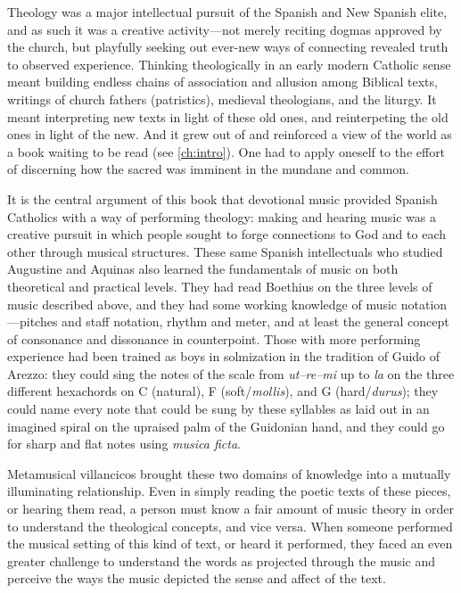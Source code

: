 Theology was a major intellectual pursuit of the Spanish and New Spanish elite,
and as such it was a creative activity---not merely reciting dogmas
approved by the church, but playfully seeking out ever-new ways of connecting
revealed truth to observed experience.
Thinking theologically in an early modern Catholic sense meant building 
endless chains of association and allusion among Biblical texts, writings of
church fathers (patristics), medieval theologians, and the liturgy. 
It meant interpreting new texts in light of these old ones, and reinterpeting
the old ones in light of the new.
And it grew out of and reinforced a view of the world as a book waiting to be
read (see \cref{ch:intro}).
One had to apply oneself to the effort of discerning how the sacred was
imminent in the mundane and common.%
    \Autocite{Chavez:DistortingReality}

It is the central argument of this book that devotional music provided Spanish
Catholics with a way of performing theology: making and hearing music was a
creative pursuit in which people sought to forge connections to God and to each
other through musical structures.
These same Spanish intellectuals who studied Augustine and Aquinas also learned
the fundamentals of music on both theoretical and practical levels.
They had read Boethius on the three levels of music described above, and they
had some working knowledge of music notation---pitches and staff notation,
rhythm and meter, and at least the general concept of consonance and dissonance
in counterpoint.
Those with more performing experience had been trained as boys in solmization in
the tradition of Guido of Arezzo: they could sing the notes of the scale from
\emph{ut--re--mi} up to \emph{la} on the three different hexachords on C
(natural), F (soft/\emph{mollis}), and G (hard/\emph{durus}); they could name
every note that could be sung by these syllables as laid out in an imagined
spiral on the upraised palm of the Guidonian hand, and they could go
 for sharp and flat notes using \emph{musica ficta}.%
    \Autocite{Cohen:NotesMiddleAges}

Metamusical villancicos brought these two domains of knowledge into a mutually
illuminating relationship.
Even in simply reading the poetic texts of these pieces, or hearing them read,
a person must know a fair amount of music theory in order to understand the
theological concepts, and vice versa.
When someone performed the musical setting of this kind of text, or heard it
performed, they faced an even greater challenge to understand the words as
projected through the music and perceive the ways the music depicted the sense
and affect of the text. 

